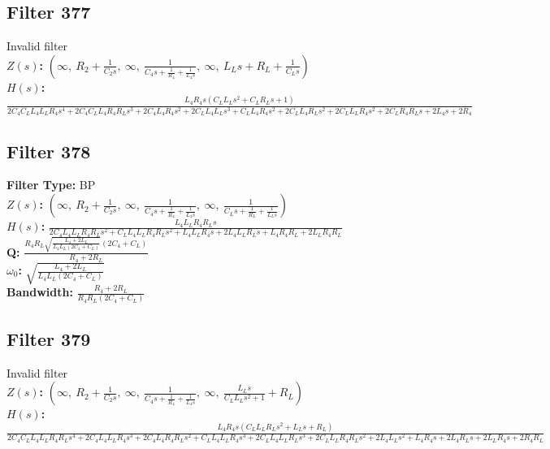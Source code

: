 \documentclass{article}
\begin{document}
\subsection*{Filter 377}
Invalid filter \\ 
\textbf{$Z(s)$:} $\left( \infty, \  R_{2} + \frac{1}{C_{2} s}, \  \infty, \  \frac{1}{C_{4} s + \frac{1}{R_{4}} + \frac{1}{L_{4} s}}, \  \infty, \  L_{L} s + R_{L} + \frac{1}{C_{L} s}\right)$ \\ 
\textbf{$H(s)$:} $\frac{L_{4} R_{4} s \left(C_{L} L_{L} s^{2} + C_{L} R_{L} s + 1\right)}{2 C_{4} C_{L} L_{4} L_{L} R_{4} s^{4} + 2 C_{4} C_{L} L_{4} R_{4} R_{L} s^{3} + 2 C_{4} L_{4} R_{4} s^{2} + 2 C_{L} L_{4} L_{L} s^{3} + C_{L} L_{4} R_{4} s^{2} + 2 C_{L} L_{4} R_{L} s^{2} + 2 C_{L} L_{L} R_{4} s^{2} + 2 C_{L} R_{4} R_{L} s + 2 L_{4} s + 2 R_{4}}$ \\ 
\subsection*{Filter 378}
\textbf{Filter Type:} BP \\ 
\textbf{$Z(s)$:} $\left( \infty, \  R_{2} + \frac{1}{C_{2} s}, \  \infty, \  \frac{1}{C_{4} s + \frac{1}{R_{4}} + \frac{1}{L_{4} s}}, \  \infty, \  \frac{1}{C_{L} s + \frac{1}{R_{L}} + \frac{1}{L_{L} s}}\right)$ \\ 
\textbf{$H(s)$:} $\frac{L_{4} L_{L} R_{4} R_{L} s}{2 C_{4} L_{4} L_{L} R_{4} R_{L} s^{2} + C_{L} L_{4} L_{L} R_{4} R_{L} s^{2} + L_{4} L_{L} R_{4} s + 2 L_{4} L_{L} R_{L} s + L_{4} R_{4} R_{L} + 2 L_{L} R_{4} R_{L}}$ \\ 
\textbf{Q:} $\frac{R_{4} R_{L} \sqrt{\frac{L_{4} + 2 L_{L}}{L_{4} L_{L} \left(2 C_{4} + C_{L}\right)}} \left(2 C_{4} + C_{L}\right)}{R_{4} + 2 R_{L}}$ \\ 
\textbf{$\omega_0$:} $\sqrt{\frac{L_{4} + 2 L_{L}}{L_{4} L_{L} \left(2 C_{4} + C_{L}\right)}}$ \\ 
\textbf{Bandwidth:} $\frac{R_{4} + 2 R_{L}}{R_{4} R_{L} \left(2 C_{4} + C_{L}\right)}$ \\ 
\subsection*{Filter 379}
Invalid filter \\ 
\textbf{$Z(s)$:} $\left( \infty, \  R_{2} + \frac{1}{C_{2} s}, \  \infty, \  \frac{1}{C_{4} s + \frac{1}{R_{4}} + \frac{1}{L_{4} s}}, \  \infty, \  \frac{L_{L} s}{C_{L} L_{L} s^{2} + 1} + R_{L}\right)$ \\ 
\textbf{$H(s)$:} $\frac{L_{4} R_{4} s \left(C_{L} L_{L} R_{L} s^{2} + L_{L} s + R_{L}\right)}{2 C_{4} C_{L} L_{4} L_{L} R_{4} R_{L} s^{4} + 2 C_{4} L_{4} L_{L} R_{4} s^{3} + 2 C_{4} L_{4} R_{4} R_{L} s^{2} + C_{L} L_{4} L_{L} R_{4} s^{3} + 2 C_{L} L_{4} L_{L} R_{L} s^{3} + 2 C_{L} L_{L} R_{4} R_{L} s^{2} + 2 L_{4} L_{L} s^{2} + L_{4} R_{4} s + 2 L_{4} R_{L} s + 2 L_{L} R_{4} s + 2 R_{4} R_{L}}$ \\ 
\end{document}
